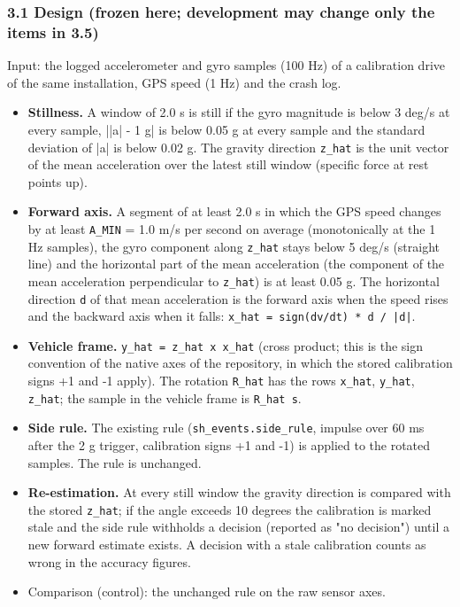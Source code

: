 \subsubsection*{3.1 Design (frozen here; development may change only the items in 3.5)}

Input: the logged accelerometer and gyro samples (100 Hz) of a calibration drive of the same installation, GPS speed (1 Hz) and the crash log.

\begin{itemize}
\item \textbf{Stillness.} A window of 2.0 s is still if the gyro magnitude is below 3 deg/s at every sample, ||a| - 1 g| is below 0.05 g at every sample and the standard deviation of |a| is below 0.02 g. The gravity direction \texttt{z\_hat} is the unit vector of the mean acceleration over the latest still window (specific force at rest points up).
\item \textbf{Forward axis.} A segment of at least 2.0 s in which the GPS speed changes by at least \texttt{A\_MIN} = 1.0 m/s per second on average (monotonically at the 1 Hz samples), the gyro component along \texttt{z\_hat} stays below 5 deg/s (straight line) and the horizontal part of the mean acceleration (the component of the mean acceleration perpendicular to \texttt{z\_hat}) is at least 0.05 g. The horizontal direction \texttt{d} of that mean acceleration is the forward axis when the speed rises and the backward axis when it falls: \texttt{x\_hat = sign(dv/dt) * d / |d|}.
\item \textbf{Vehicle frame.} \texttt{y\_hat = z\_hat x x\_hat} (cross product; this is the sign convention of the native axes of the repository, in which the stored calibration signs +1 and -1 apply). The rotation \texttt{R\_hat} has the rows \texttt{x\_hat}, \texttt{y\_hat}, \texttt{z\_hat}; the sample in the vehicle frame is \texttt{R\_hat s}.
\item \textbf{Side rule.} The existing rule (\texttt{sh\_events.side\_rule}, impulse over 60 ms after the 2 g trigger, calibration signs +1 and -1) is applied to the rotated samples. The rule is unchanged.
\item \textbf{Re-estimation.} At every still window the gravity direction is compared with the stored \texttt{z\_hat}; if the angle exceeds 10 degrees the calibration is marked stale and the side rule withholds a decision (reported as "no decision") until a new forward estimate exists. A decision with a stale calibration counts as wrong in the accuracy figures.
\item Comparison (control): the unchanged rule on the raw sensor axes.
\end{itemize}

